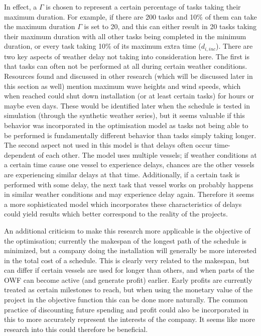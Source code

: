\documentclass[a4paper,12pt]{article}
\begin{document}
In effect, a $\Gamma$ is chosen to represent a certain percentage of tasks taking their maximum duration. For example, if there are 200 tasks and 10\% of them can take the maximum duration $\Gamma$ is set to 20, and this can either result in 20 tasks taking their maximum duration with all other tasks being completed in the minimum duration, or every task taking 10\% of its maximum extra time ($d_{i, inc}$). There are two key aspects of weather delay not taking into consideration here. The first is that tasks can often not be performed at all during certain weather conditions. Resources found and discussed in other research (which will be discussed later in this section as well) mention maximum wave heights and wind speeds, which when reached could shut down installation (or at least certain tasks) for hours or maybe even days. These would be identified later when the schedule is tested in simulation (through the synthetic weather series), but it seems valuable if this behavior was incorporated in the optimisation model as tasks not being able to be performed is fundamentally different behavior than tasks simply taking longer. The second aspect not used in this model is that delays often occur time-dependent of each other. The model uses multiple vessels; if weather conditions at a certain time cause one vessel to experience delays, chances are the other vessels are experiencing similar delays at that time. Additionally, if a certain task is performed with some delay, the next task that vessel works on probably happens in similar weather conditions and may experience delay again. Therefore it seems a more sophisticated model which incorporates these characteristics of delays could yield results which better correspond to the reality of the projects. 

An additional criticism to make this research more applicable is the objective of the optimisation; currently the makespan of the longest path of the schedule is minimized, but a company doing the installation will generally be more interested in the total cost of a schedule. This is clearly very related to the makespan, but can differ if certain vessels are used for longer than others, and when parts of the OWF can become active (and generate profit) earlier. Early profits are currently treated as certain milestones to reach, but when using the monetary value of the project in the objective function this can be done more naturally. The common practice of discounting future spending and profit could also be incorporated in this to more accurately represent the interests of the company. It seems like more research into this could therefore be beneficial. 
\end{document}
